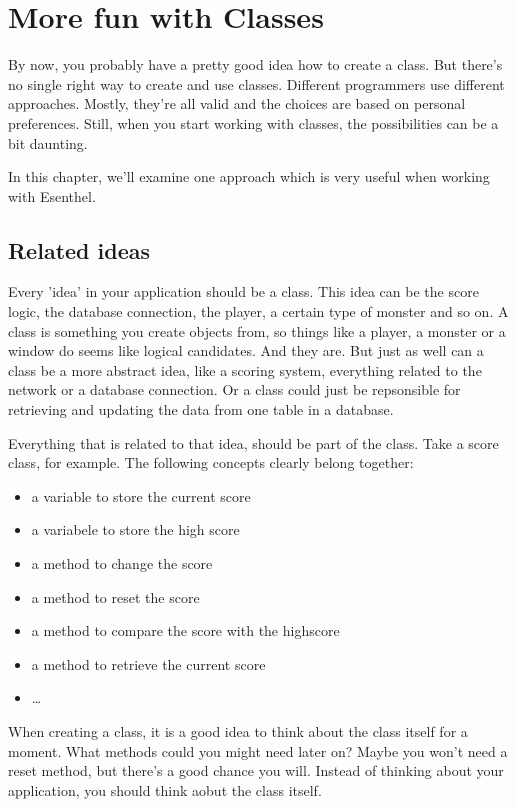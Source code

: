 \chapter{More fun with Classes}

By now, you probably have a pretty good idea how to create a class. But there's no single right way to create and use classes. Different programmers use different approaches. Mostly, they're all valid and the choices are based on personal preferences. Still, when you start working with classes, the possibilities can be a bit daunting.

In this chapter, we'll examine one approach which is very useful when working with Esenthel.  

\section{Related ideas}

Every 'idea' in your application should be a class. This idea can be the score logic, the database connection, the player, a certain type of monster and so on. A class is something you create objects from, so things like a player, a monster or a window do seems like logical candidates. And they are. But just as well can a class be a more abstract idea, like a scoring system, everything related to the network or a database connection. Or a class could just be repsonsible for retrieving and updating the data from one table in a database. 

Everything that is related to that idea, should be part of the class. Take a score class, for example. The following concepts clearly belong together: 

\begin{itemize}
\item a variable to store the current score
\item a variabele to store the high score
\item a method to change the score
\item a method to reset the score
\item a method to compare the score with the highscore
\item a method to retrieve the current score
\item \ldots
\end{itemize}

When creating a class, it is a good idea to think about the class itself for a moment. What methods could you might need later on? Maybe you won't need a reset method, but there's a good chance you will. Instead of thinking about your application, you should think aobut the class itself.

